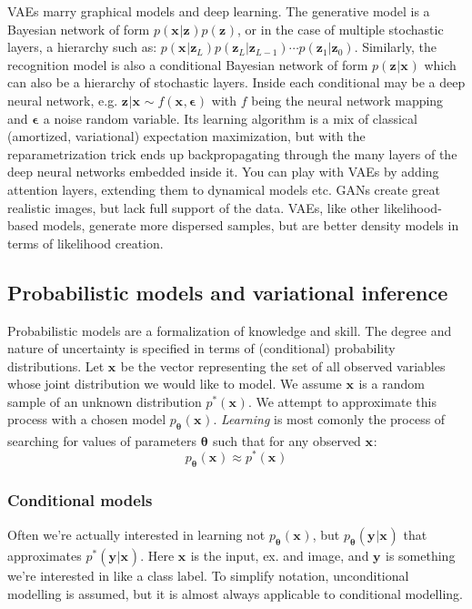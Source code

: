 \documentclass{article}
\begin{document}
VAEs marry graphical models and deep learning.
The generative model is a Bayesian network of form
$ p (\bm{x}_{}| \bm{z}_{})p (\bm{z}_{})  $,
or in the case of multiple stochastic layers, a hierarchy such as:
$ p (\bm{x}_{}| \bm{z}_{L})p (\bm{z}_{L}|\bm{z}_{L-1})\cdots p (\bm{z}_{1}|\bm{z}_{0})  $.
Similarly, the recognition model is also a conditional Bayesian network of
form $ p (\bm{z}_{}|\bm{x}_{})  $ which can also be a hierarchy of
stochastic layers.
Inside each conditional may be a deep neural network,
e.g. $ \bm{z}_{}|\bm{x}_{} \sim f (\bm{x}_{}, \bm{\epsilon}_{})  $
with $ f  $ being the neural network mapping and $ \bm{\epsilon}_{}  $ a
noise random variable.
Its learning algorithm is a mix of classical (amortized, variational)
expectation maximization, but with the reparametrization trick
ends up backpropagating through the many layers of the deep neural networks
embedded inside it.
You can play with VAEs by adding attention layers,
extending them to dynamical models etc.
GANs create great realistic images, but lack full support of the data.
VAEs, like other likelihood-based models, generate more dispersed samples,
but are better density models in terms of likelihood creation.


\subsection{Probabilistic models and variational inference}
Probabilistic models are a formalization of knowledge and skill.
The degree and nature of uncertainty is specified in terms
of (conditional) probability distributions.
Let $ \bm{x}_{}  $ be the vector representing the set of all observed
variables whose joint distribution we would like to model.
We assume $ \bm{x}_{}  $ is a random sample of an unknown distribution
$ p^{ * } (\bm{x}_{})  $.
We attempt to approximate this process with a chosen model $ p_{ \bm{\theta}_{} } (\bm{x}_{})  $.
\textit{Learning} is most comonly the process of searching for values of parameters
$ \bm{\theta}_{}  $ such that for any observed $ \bm{x}_{}  $:
\begin{equation}
		p_{ \bm{\theta}_{} } (\bm{x}_{}) \approx  p^{ * } (\bm{x}_{})  
\end{equation}

\subsubsection{Conditional models}
Often we're actually interested in learning not $ p_{ \bm{\theta}_{} } (\bm{x}_{})  $,
but $ p_{ \bm{\theta}_{} } (\bm{y}_{}|\bm{x}_{})  $
that approximates $  p^{ * } (\bm{y}_{}|\bm{x}_{})    $.
Here $ \bm{x}_{}  $ is the input, ex. and image,
and $ \bm{y}_{}  $ is something we're interested in like a class label.
To simplify notation, unconditional modelling is assumed,
but it is almost always applicable to conditional modelling.
\end{document}

